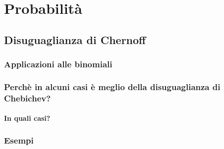 \documentclass[\main/main.tex]{subfiles}
\begin{document}
\chapter{Probabilità}
\section{Disuguaglianza di Chernoff}
\subsection{Applicazioni alle binomiali}
\subsection{Perchè in alcuni casi è meglio della disuguaglianza di Chebichev?}
\subsubsection{In quali casi?}
\subsection{Esempi}
\end{document}
